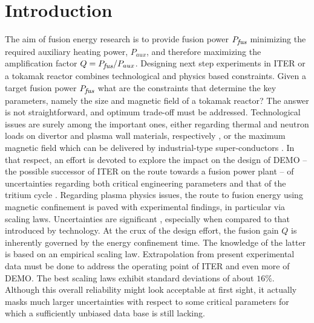 \documentclass[12pt]{iopart}
\newcommand{\Pfus}{{P_{\textrm{\it\footnotesize fus}}}}
\begin{document}
\section{Introduction}
The aim of fusion energy research is to provide fusion power  $\Pfus$ minimizing the required auxiliary heating power, $P_{aux}$, and therefore maximizing the amplification factor $Q = \Pfus/P_{aux}$. Designing next step experiments in ITER or a tokamak reactor combines technological and physics based constraints. Given a target fusion power $\Pfus$ what are the constraints that determine the key parameters, namely the size and magnetic field of a tokamak reactor? The answer is not straightforward, and optimum trade-off must be addressed. Technological issues are surely among the important ones, either regarding thermal and neutron loads on divertor and plasma wall materials, respectively \cite{Federici2017, Siccinio2018}, or the maximum magnetic field which can be delivered by industrial-type super-conductors \cite{Duchateau2014}. In that respect, an effort is devoted to explore the impact on the design of DEMO -- the possible successor of ITER on the route towards a fusion power plant \cite{Federici2017} -- of uncertainties regarding both critical engineering parameters \cite{Coleman2016,Reux2018} and that of the tritium cycle \cite{Coleman2019}.
Regarding plasma physics issues, the route to fusion energy using magnetic confinement is paved with experimental findings, in particular via scaling laws. Uncertainties are significant \cite{Zohm2013}, especially when compared to that introduced by technology. At the crux of the design effort, the fusion gain $Q$ is inherently governed by the energy confinement time. The knowledge of the latter is based on an empirical scaling law.  Extrapolation from present experimental data must be done to address the operating point of ITER and even more of DEMO. The best scaling laws exhibit standard deviations of about $16\%$. Although this overall reliability might look acceptable at first sight, it actually masks much larger uncertainties with respect to some critical parameters for which a sufficiently unbiased data base is still lacking. \\
\end{document}
